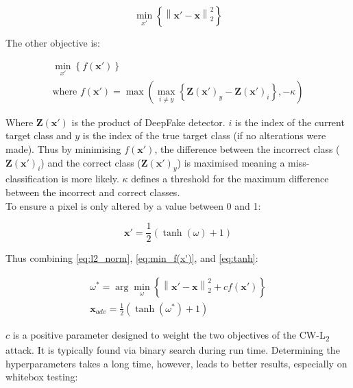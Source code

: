 \documentclass{article}
\begin{document}
\begin{equation}
\label{eq:l2_norm}
    \mathop {\min} \limits_{x'} \left\{ \left\| \mathbf{x}' - \mathbf{x} \right\|_2^2 \right\}
\end{equation}

The other objective is:

\begin{equation}
\label{eq:min_f(x')}
\begin{array}{c} 
    \mathop {\min} \limits_{x'} \left\{ f\left( \mathbf{x}' \right) \right\} \\
    \text{where } f\left( \mathbf{x}' \right) = \max \left( \max_{i \ne y} \left\{ \mathbf{Z} \left( \mathbf{x}' \right)_y - \mathbf{Z} \left( \mathbf{x}' \right)_i \right\}, - \kappa \right)
\end{array}
\end{equation}

Where $\mathbf{Z}(\mathbf{x}')$ is the product of DeepFake detector. $i$ is the index of the current target class and $y$ is the index of the true target class (if no alterations were made). Thus by minimising $f(\mathbf{x}')$, the difference between the incorrect class ($\mathbf{Z}{{\left( {{\mathbf{x}}'} \right)}_i}$) and the correct class (${\mathbf{Z}}{{\left( {{\mathbf{x}}'} \right)}_y}$) is maximised meaning a miss-classification is more likely. $\kappa$ defines a threshold for the maximum difference between the incorrect and correct classes.\\

To ensure a pixel is only altered by a value between 0 and 1:

\begin{equation}
\label{eq:tanh}
    \mathbf{x}' = \frac{1}{2}(\tanh (\omega ) + 1)
\end{equation}

Thus combining \ref{eq:l2_norm}, \ref{eq:min_f(x')}, and \ref{eq:tanh}:

\begin{equation}
\begin{array}{c}
    \omega^\ast = \arg \min_\omega \left\{ \left\| \mathbf{x}' - \mathbf{x} \right\|_2^2 + cf\left( \mathbf{x}' \right) \right\} \\
    \mathbf{x}_{adv} = \frac{1}{2}\left( \tanh \left( \omega^\ast \right) + 1 \right)
\end{array}
\end{equation}

$c$ is a positive parameter designed to weight the two objectives of the CW-L\textsubscript{2} attack. It is typically found via binary search during run time. Determining the hyperparameters takes a long time, however, leads to better results, especially on whitebox testing:
\end{document}
